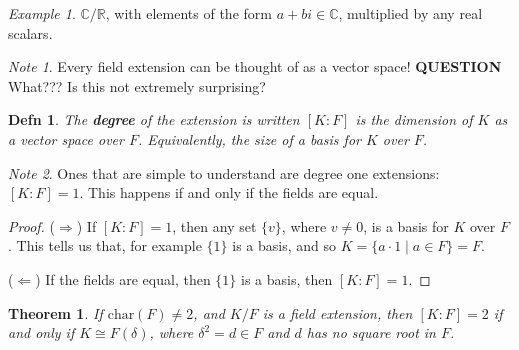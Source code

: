 \documentclass[12pt]{article}
\def\char{\text{char}}
\def\R{{\mathbb R}}
\def\C{{\mathbb C}}
\def\QUESTION{\color{red}\textbf{QUESTION}\color{black}\,}
\newtheorem{theorem}{Theorem}
\newtheorem{definition}{Defn}
\theoremstyle{remark}
\theoremstyle{remark}
\theoremstyle{remark}
\newtheorem{example}{Example}
\theoremstyle{remark}
\theoremstyle{remark}
\newtheorem*{note}{Note}
\begin{document}
\begin{example}
  $\C / \R$, with elements of the form $a + bi \in \C$, multiplied by any real
  scalars.
\end{example}

\begin{note}
  Every field extension can be thought of as a vector space! \QUESTION What???
  Is this not extremely surprising?
\end{note}

\begin{definition}
  The {\bf degree} of the extension is written $[K : F]$ is the dimension of $K$
  as a vector space over $F$. Equivalently, the size of a basis for $K$ over
  $F$.
\end{definition}

\begin{note}
  Ones that are simple to understand are degree one extensions: $[K : F] = 1$.
  This happens if and only if the fields are equal.
\end{note}

\begin{proof}
  ($\Rightarrow$) If $[K : F] = 1$, then any set $\{v\}$, where $v \ne 0$, is
  a basis for $K$ over $F$. This tells us that, for example $\{1\}$ is a basis,
  and so $K = \{ a \cdot 1 \mid a \in F \} = F$.

  ($\Leftarrow$) If the fields are equal, then $\{1\}$ is a basis, then $[K : F]
  = 1$.
\end{proof}

\begin{theorem}
  If $\char(F) \ne 2$, and $K / F$ is a field extension, then $[K : F] = 2$ if
  and only if $K \cong F(\delta)$, where $\delta^2 = d \in F$ and $d$ has no
  square root in $F$.
\end{theorem}
\end{document}
